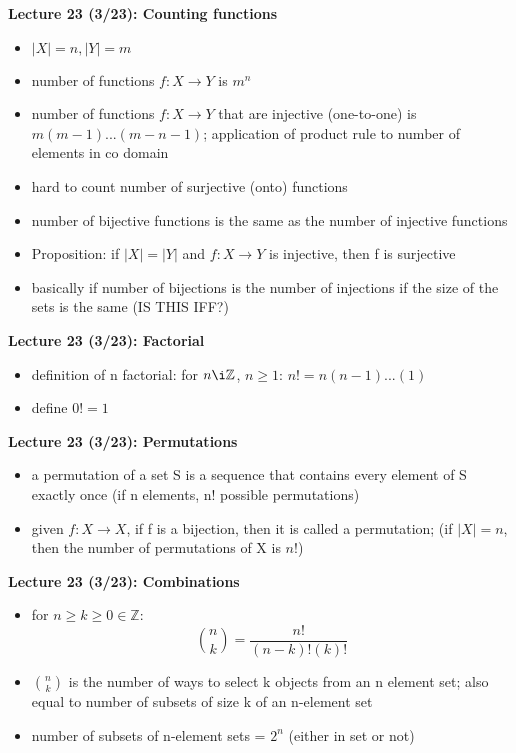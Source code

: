 \documentclass[twocolumn]{article}
\begin{document}
\textbf{Lecture 23 (3/23): Counting functions}
\begin{itemize}
    \item $|X|=n, |Y|=m$
    \item number of functions $f:X \rightarrow Y$ is $m^n$
    \item number of functions $f:X\rightarrow Y$ that are injective (one-to-one) is $m(m-1)...(m-n-1)$; application of product rule to number of elements in co domain
    \item hard to count number of surjective (onto) functions
    \item number of bijective functions is the same as the number of injective functions
    \item Proposition: if $|X|=|Y|$ and $f:X\rightarrow Y$ is injective, then f is surjective
    \item basically if number of bijections is the number of injections if the size of the sets is the same (IS THIS IFF?)
\end{itemize}

\textbf{Lecture 23 (3/23): Factorial}
\begin{itemize}
    \item definition of n factorial:
    for $n \i \mathbb{Z}$, $n\geq 1$:
    $n! = n(n-1)...(1)$
    \item define $0!=1$ 
\end{itemize}

\textbf{Lecture 23 (3/23): Permutations}
\begin{itemize}
    \item a permutation of a set S is a sequence that contains every element of S exactly once (if n elements, n! possible permutations)
    \item given $f: X \rightarrow X$, if f is a bijection, then it is called a permutation; (if $|X|=n$, then the number of permutations of X is $n!$)
\end{itemize}

\textbf{Lecture 23 (3/23): Combinations}
\begin{itemize}
    \item for $n \geq k \geq 0 \in \mathbb{Z}$:
     $${n \choose k} = \frac{n!}{(n-k)!(k)!}$$
    \item ${n \choose k}$ is the number of ways to select k objects from an n element set; also equal to number of subsets of size k of an n-element set
    \item number of subsets of n-element sets = $2^n$ (either in set or not)
\end{itemize}
\end{document}
